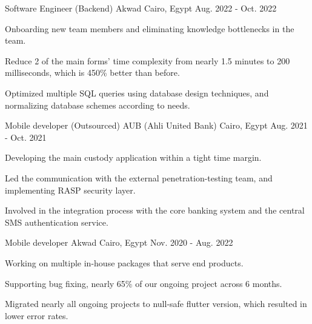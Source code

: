 \begin{cventries}
  \cventry
    {Software Engineer (Backend)} %
    {Akwad} %
    {Cairo, Egypt} %
    {Aug. 2022 - Oct. 2022} %
    {
      \begin{cvitems} %
        \item {Onboarding new team members and eliminating knowledge bottlenecks in the team.}
        \item {Reduce 2 of the main forms' time complexity from nearly 1.5 minutes to 200 milliseconds, which is 450\% better than before.}
        \item {Optimized multiple SQL queries using database design techniques, and normalizing database schemes according to needs.}
      \end{cvitems}
    }

  \cventry
    {Mobile developer (Outsourced)} %
    {AUB (Ahli United Bank)} %
    {Cairo, Egypt} %
    {Aug. 2021 - Oct. 2021} %
    {
      \begin{cvitems} %
        \item {Developing the main custody application within a tight time margin.}
        \item {Led the communication with the external penetration-testing team, and implementing RASP security layer.}
        \item {Involved in the integration process with the core banking system and the central SMS authentication service.}
      \end{cvitems}
    }

  \cventry
    {Mobile developer} %
    {Akwad} %
    {Cairo, Egypt} %
    {Nov. 2020 - Aug. 2022} %
    {
      \begin{cvitems} %
        \item {Working on multiple in-house packages that serve end products.}
        \item {Supporting bug fixing, nearly 65\% of our ongoing project across 6 months.}
        \item {Migrated nearly all ongoing projects to null-safe flutter version, which resulted in lower error rates.}
      \end{cvitems}
    }

\end{cventries}

